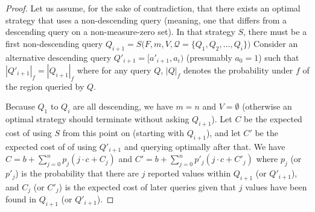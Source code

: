 \begin{proof}
Let us assume, for the sake of contradiction,
that there exists  an optimal strategy  that uses a 
non-descending query (meaning, one that differs from a descending query on
a non-measure-zero set).
In that strategy $S$, there must be a first non-descending query
$Q_{i+1} = S\big(F, m, V, \mathcal Q = \{Q_1, Q_2, \ldots, Q_i\}\big)$
Consider an alternative descending query
$Q'_{i+1} = [a'_{i+1}, a_i)$ (presumably $a_0 = 1$) such
that $|Q'_{i+1}|_f = |Q_{i+1}|_f$
where for any query $Q$, $|Q|_f$ denotes the probability under $f$ of the
region queried by $Q$.

Because $Q_1$ to $Q_i$ are all descending, we have $m = n$ and $V = \emptyset$ (otherwise
an optimal strategy should terminate without asking $Q_{i+1}$).
Let $C$ be the expected cost of using $S$ from this point on
(starting with $Q_{i+1}$), and let $C'$ be the expected cost of 
of using $Q'_{i+1}$ and querying
optimally after that. We have\\
$
C = b + \sum_{j=0}^n p_j ( j \cdot c + C_j)
$
and
$
C' = b + \sum_{j=0}^n p'_j ( j \cdot c + C'_j)
$
where
$p_j$ (or $p'_j$) is the probability that there are $j$ reported values
within $Q_{i+1}$ (or $Q'_{i+1}$), and
$C_j$ (or $C'_j$) is the expected cost of later queries given that $j$ values have been
found in $Q_{i+1}$ (or $Q'_{i+1}$).


\end{proof}
